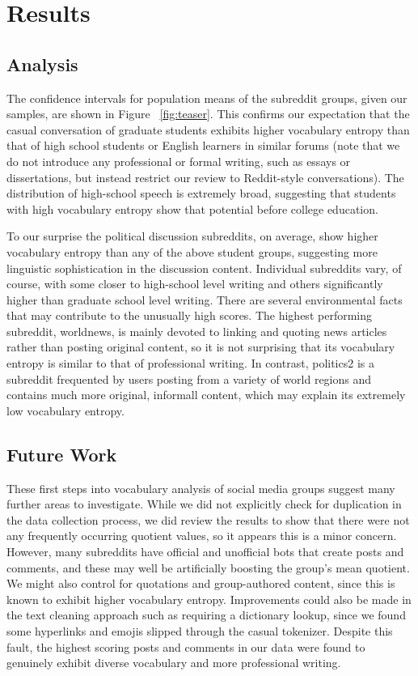\documentclass[sigconf]{acmart}
\begin{document}
\section{Results}

\subsection{Analysis}

The confidence intervals for population means of the subreddit groups, given
our samples, are shown in Figure ~\ref{fig:teaser}. This confirms our expectation that
the casual conversation of graduate students exhibits higher vocabulary
entropy than that of high school students or English learners in similar
forums (note that we do not introduce any professional or formal writing, such as essays or
dissertations, but instead restrict our review to Reddit-style conversations). The
distribution of high-school speech is extremely broad, suggesting that
students with high vocabulary entropy show that potential before college
education. 

To our surprise the political discussion subreddits, on average, show higher
vocabulary entropy than any of the above student groups, suggesting more
linguistic sophistication in the discussion content. Individual subreddits
vary, of course, with some closer to high-school level writing and others
significantly higher than graduate school level writing. There are several
environmental facts that may contribute to the unusually high scores.
The highest performing
subreddit, worldnews, is mainly devoted to linking and quoting news
articles rather than posting original content, so it is not surprising that
its vocabulary entropy is similar to that of professional writing. In
contrast, politics2 is a subreddit frequented by users posting from a
variety of world regions and contains much more original, informall
content, which may explain its extremely low vocabulary entropy. 

\subsection{Future Work}

These first steps into vocabulary analysis of social media groups suggest
many further areas to investigate. While we did not explicitly check for
duplication in the data collection process, we did review the results to
show that there were not any frequently occurring quotient values, so it
appears this is a minor concern. However, many subreddits have official and
unofficial bots that create posts and comments, and these may well be
artificially boosting the group's mean quotient. We might also control for
quotations and group-authored content, since this is known to exhibit higher
vocabulary entropy. Improvements could also be made in the text cleaning
approach such as requiring a dictionary lookup, since we found some hyperlinks and
emojis slipped through the casual tokenizer. Despite this fault, the
highest scoring posts and comments in our data were found to genuinely
exhibit diverse vocabulary and more professional writing. 
\end{document}
